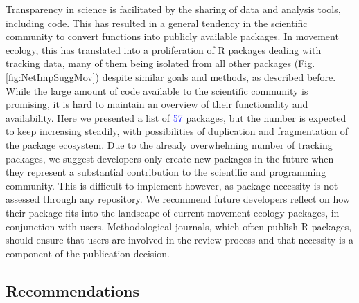 \documentclass[a4paper,12pt]{article}
\begin{document}
Transparency in science is facilitated by the sharing of data and analysis tools, including code. This has resulted in a general tendency in the scientific community to convert functions into publicly available packages. %
In movement ecology, this has translated into a proliferation of R packages dealing with tracking data, many of them being isolated from all other packages (Fig. \ref{fig:NetImpSuggMov}) despite similar goals and methods, as described before. While the large amount of code available to the scientific community is promising, it is hard to maintain an overview of their functionality and availability. Here we presented a list of \textcolor{blue}{57} packages, but the number is expected to keep increasing steadily, with possibilities of duplication and fragmentation of the package ecosystem. Due to the already overwhelming number of tracking packages, we suggest developers only create new packages in the future when they represent a substantial contribution to the scientific and programming community. This is difficult to implement however, as package necessity is not assessed through any repository. %
We recommend future developers reflect on how their package fits into the landscape of current movement ecology packages, in conjunction with users. Methodological journals, which often publish R packages, should ensure that users are involved in the review process and that necessity is a component of the publication decision.

\subsection*{Recommendations}
\end{document}
